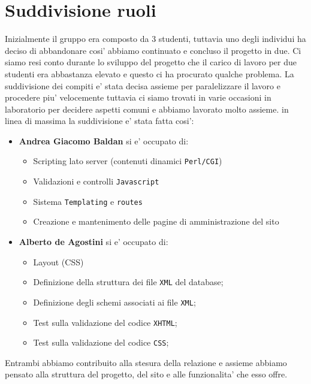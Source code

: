\section{Suddivisione ruoli}

Inizialmente il gruppo era composto da 3 studenti, tuttavia uno degli individui ha deciso di abbandonare cosi' abbiamo continuato e concluso il progetto in due.
Ci siamo resi conto durante lo sviluppo del progetto che il carico di lavoro per due studenti era abbastanza elevato e questo ci ha procurato qualche problema.
La suddivisione dei compiti e' stata decisa assieme per paralelizzare il lavoro e procedere piu' velocemente tuttavia ci siamo trovati in varie occasioni in laboratorio per decidere aspetti comuni e abbiamo lavorato molto assieme.
in linea di massima la suddivisione e' stata fatta cosi':
\begin{itemize}
	\item \textbf{Andrea Giacomo Baldan} si e' occupato di:
	\begin{itemize}
		\item Scripting lato server (contenuti dinamici \texttt{Perl/CGI})
		\item Validazioni e controlli \texttt{Javascript} 
		\item Sistema \texttt{Templating} e \texttt{routes}
		\item Creazione e mantenimento delle pagine di amministrazione del sito
	\end{itemize}
	\item \textbf{Alberto de Agostini} si e' occupato di:
	\begin{itemize}
		\item Layout (CSS)
		\item Definizione della struttura dei file \texttt{XML} del database;
		\item Definizione degli schemi associati ai file \texttt{XML};
		\item Test sulla validazione del codice \texttt{XHTML};
		\item Test sulla validazione del codice \texttt{CSS};
	\end{itemize}
\end{itemize}
Entrambi abbiamo contribuito alla stesura della relazione e assieme abbiamo pensato alla struttura del progetto, del sito e alle funzionalita' che esso offre.
